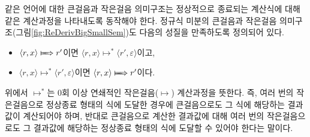 같은 언어에 대한 큰걸음과 작은걸음 의미구조는 정상적으로 종료되는 계산식에
대해 같은 계산과정을 나타내도록 동작해야 한다. 정규식 미분의 큰걸음과
작은걸음 의미구조(그림\;\ref{fig:ReDerivBigSmallSem})도 다음의 성질을
만족하도록 정의되어 있다.
\vspace*{-1ex}
\begin{itemize}\tightlist
 \item
  $\langle r,x\rangle\LONGmapsto r'$이면
  $\langle r,x\rangle\longmapsto^{*} \langle r',\varepsilon\rangle$이고,
 \item
  $\langle r,x\rangle\longmapsto^{*} \langle r',\varepsilon\rangle$이면
  $\langle r,x\rangle\LONGmapsto r'$이다. \vspace*{-1ex}
\end{itemize}
위에서 $\longmapsto^{*}$는 0회 이상 연쇄적인 작은걸음($\longmapsto$)
계산과정을 뜻한다. 즉, 여러 번의 작은걸음으로 정상종료 형태의 식에 도달한
경우에 큰걸음으로도 그 식에 해당하는 결과값이 계산되어야 하며, 반대로
큰걸음으로 계산한 결과값에 대해 여러 번의 작은걸음으로도 그 결과값에
해당하는 정상종료 형태의 식에 도달할 수 있어야 한다는 말이다.

